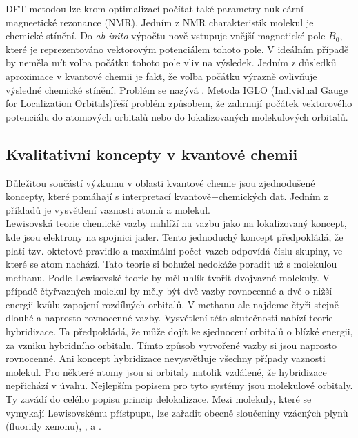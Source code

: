 \documentclass[
  digital, %
  table,   %
  lof,     %
  lot,     %
]{fithesis3}
\begin{document}
 DFT metodou lze krom optimalizací počítat také parametry nukleární magneetické rezonance (NMR). Jedním z NMR charakteristik molekul je chemické stínění. Do \textit{ab-inito} výpočtu nově vstupuje vnější magnetické pole $B_0$, které je reprezentováno vektorovým potenciálem tohoto pole. V ideálním případě by neměla mít volba počátku tohoto pole vliv na výsledek. Jedním z důsledků aproximace v kvantové chemii je fakt, že volba počátku výrazně ovlivňuje výsledné chemické stínění. Problém se nazývá . Metoda IGLO (Individual Gauge for Localization Orbitals)řeší problém způsobem, že zahrnují počátek vektorového potenciálu do atomových orbitalů nebo do lokalizovaných molekulových orbitalů.\cite{Standara2006thesis}

\subsection{Kvalitativní koncepty v kvantové chemii}
Důležitou součástí výzkumu v oblasti kvantové chemie jsou zjednodušené koncepty, které pomáhají s interpretací kvantově$-$chemických dat. Jedním z příkladů je vysvětlení vaznosti atomů a molekul. \\
Lewisovská teorie chemické vazby nahlíží na vazbu jako na lokalizovaný koncept, kde jsou elektrony na spojnici jader. Tento jednoduchý koncept předpokládá, že platí tzv. oktetové pravidlo a maximální počet vazeb odpovídá číslu skupiny, ve které se atom nachází. Tato teorie si bohužel nedokáže poradit už s molekulou methanu. Podle Lewisovské teorie by měl uhlík tvořit dvojvazné molekuly. V případě čtyřvazných molekul by měly být dvě vazby rovnocenné a dvě o nižší energii kvůlu zapojení rozdílných orbitalů. V methanu ale najdeme čtyři stejně dlouhé a naprosto rovnocenné vazby. Vysvětlení této skutečnosti nabízí teorie hybridizace. Ta předpokládá, že může dojít ke sjednocení orbitalů o blízké energii, za vzniku hybridního orbitalu. Tímto způsob vytvořené vazby si jsou naprosto rovnocenné. Ani koncept hybridizace nevysvětluje všechny případy vaznosti molekul. Pro některé atomy jsou si orbitaly natolik vzdálené, že hybridizace nepřichází v úvahu. Nejlepším popisem pro tyto systémy jsou molekulové orbitaly. Ty zavádí do celého popisu princip delokalizace. Mezi molekuly, které se vymykají Lewisovskému přístpupu, lze zařadit obecně sloučeniny vzácných plynů (fluoridy xenonu),  ,  a . \\
\end{document}
